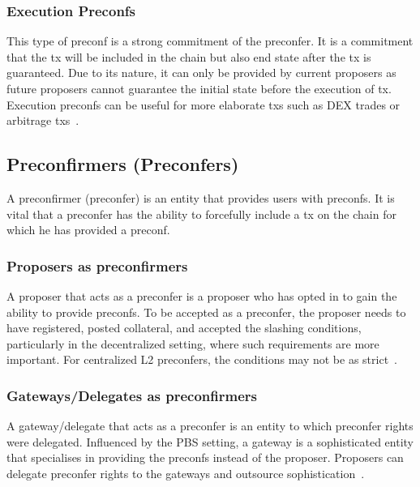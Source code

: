 \documentclass[conference]{IEEEtran}
\theoremstyle{boldstyle}
\begin{document}
        \subsubsection{Execution Preconfs}
        This type of preconf is a strong commitment of the preconfer. It is a commitment that the tx will be included in the chain but also end state after the tx is guaranteed. Due to its nature, it can only be provided by current proposers as future proposers cannot guarantee the initial state before the execution of tx\cite{W:AnalyzingBFTProposer-PromisedPreconfirmations}. Execution preconfs can be useful for more elaborate txs such as DEX trades or arbitrage txs~\cite{W:PreconfirmationsforVanillaBasedRollups}.
    
    \subsection{Preconfirmers (Preconfers)}
    A preconfirmer (preconfer) is an entity that provides users with preconfs. It is vital that a preconfer has the ability to forcefully include a tx on the chain for which he has provided a preconf. 
    
        \subsubsection{Proposers as preconfirmers}
    A proposer that acts as a preconfer is a proposer who has opted in to gain the ability to provide preconfs. To be accepted as a preconfer, the proposer needs to have registered, posted collateral, and accepted the slashing conditions, particularly in the decentralized setting, where such requirements are more important. For centralized L2 preconfers, the conditions may not be as strict~\cite{W:SequencerOpt-InDiscoveryandCommunication,W:Preconfirmations:Explained}.
    
        \subsubsection{Gateways/Delegates as preconfirmers}
    A gateway/delegate that acts as a preconfer is an entity to which preconfer rights were delegated. Influenced by the PBS setting, a gateway is a sophisticated entity that specialises in providing the preconfs instead of the proposer. Proposers can delegate preconfer rights to the gateways and outsource sophistication~\cite{W:ThePreconfirmationGatewayUnlockingPreconfirmations:FromUsertoPreconfer, W:Ahead-of-TimeBlockAuctionsToEnableExecutionPreconfirmations,W:DelegationinBolt:OutsourcingSophisticationWhilePreservingDecentralization}.
    
\end{document}
